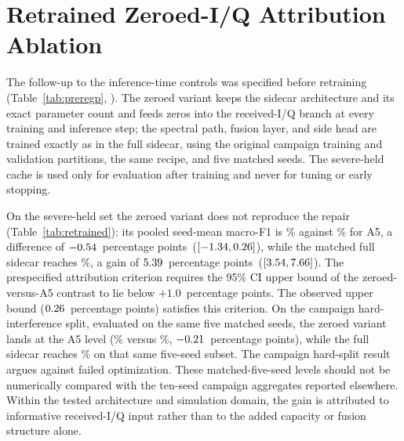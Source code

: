 \documentclass[letterpaper,onecolumn,11pt,journal]{IEEEtran}
\newcommand{\pp}{percentage points}
\begin{document}
\section{Retrained Zeroed-I/Q Attribution Ablation}
\label{sec:retrained}

The follow-up to the inference-time controls was specified before retraining
(Table~\ref{tab:preregp},
). The zeroed variant keeps
the sidecar architecture and its exact parameter count and feeds zeros into
the received-I/Q branch at every training and inference step; the spectral
path, fusion layer, and side head are trained exactly as in the full sidecar,
using the original campaign training and validation partitions, the same
recipe, and five matched seeds. The severe-held cache is used only for
evaluation after training and never for tuning or early stopping.

On the severe-held set the zeroed variant does not reproduce the repair
(Table~\ref{tab:retrained}): its pooled seed-mean macro-F1 is
\RetrainedIqzeroPooledLevel\% against \SevereRepairLevelAFive\% for A5, a
difference of $-0.54$~\pp\
($[-1.34,0.26]$), while the
matched full sidecar reaches \RetrainedFullPooledLevel\%, a gain of
$5.39$~\pp\
($[3.54,7.66]$). The
prespecified attribution criterion requires the 95\% CI upper bound of the
zeroed-versus-A5 contrast to lie below $+1.0$~\pp. The observed upper bound
($0.26$~\pp) satisfies this criterion. On the campaign
hard-interference split, evaluated on the same five matched seeds,
the zeroed variant lands at the A5 level (\RetrainedCampaignIqzeroLevel\%
versus \RetrainedCampaignAFiveLevel\%,
$-0.21$~\pp), while the full sidecar reaches
\RetrainedCampaignFullLevel\% on that same five-seed subset. The campaign
hard-split result argues against failed optimization. These matched-five-seed
levels should not be numerically compared with the ten-seed
campaign aggregates reported elsewhere. Within the tested architecture and
simulation domain, the gain is attributed to informative received-I/Q input
rather than to the added capacity or fusion structure alone.
\end{document}
